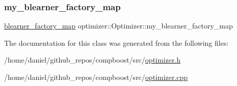 \subsubsection{\texorpdfstring{my\+\_\+blearner\+\_\+factory\+\_\+map}{my\_blearner\_factory\_map}}
{\footnotesize\ttfamily \hyperlink{baselearner__factory__list_8h_a058570e00ae11b882cfed36eb40be025}{blearner\+\_\+factory\+\_\+map} optimizer\+::\+Optimizer\+::my\+\_\+blearner\+\_\+factory\+\_\+map\hspace{0.3cm}{\ttfamily [protected]}}



The documentation for this class was generated from the following files\+:\begin{DoxyCompactItemize}
\item 
/home/daniel/github\+\_\+repos/compboost/src/\hyperlink{optimizer_8h}{optimizer.\+h}\item 
/home/daniel/github\+\_\+repos/compboost/src/\hyperlink{optimizer_8cpp}{optimizer.\+cpp}\end{DoxyCompactItemize}
